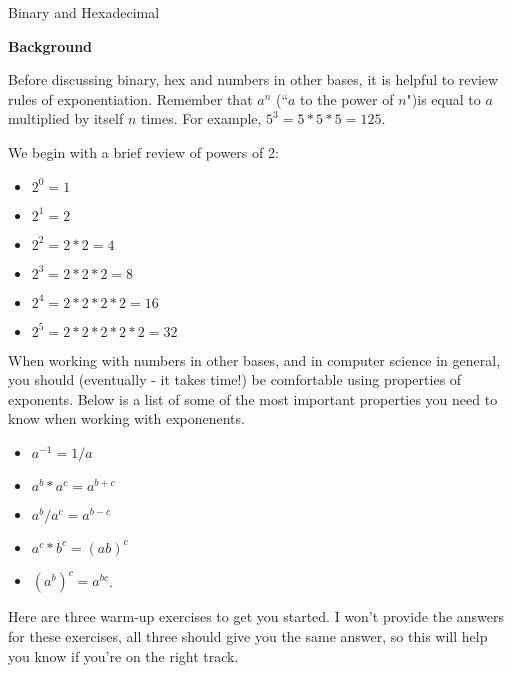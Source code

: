 \documentclass{article}
\begin{document}
\begin{Large}

\noindent Binary and Hexadecimal

\end{Large}

\vspace{0.5in}

\noindent\textbf{Background}

\vspace{0.3in}

Before discussing binary, hex and numbers in other bases, it is helpful to review rules of exponentiation. Remember that $a^n$ (``$a$ to the power of $n$")is equal to $a$ multiplied by itself $n$ times. For example, \newline $5^3=5*5*5=125$.

\vspace{0.2in}

We begin with a brief review of powers of 2:
\begin{itemize}
\item[] $2^0 = 1$ 
\item[] $2^1 = 2$ 
\item[] $2^2 = 2*2 = 4$ 
\item[] $2^3 = 2*2*2 = 8$ 
\item[] $2^4 = 2*2*2*2 = 16$ 
\item[] $2^5 = 2*2*2*2*2 = 32$ 
\end{itemize}

\vspace{0.2in}

When working with numbers in other bases, and in computer science in general, you should (eventually - it takes time!) be comfortable using properties of exponents.  Below is a list of some of the most important properties you need to know when working with exponenents.
\begin{itemize}
\item[] $a^{-1}=1/a$
\item[] $a^b*a^c = a^{b+c}$
\item[] $a^b/a^c = a^{b-c}$
\item[] $a^c*b^c = (ab)^c$
\item[] $\left(a^b\right)^c=a^{bc}$.
\end{itemize}

\vspace{0.2in}

Here are three warm-up exercises to get you started. I won't provide the answers for these exercises, all three should give you the same answer, so this will help you know if you're on the right track.
\end{document}
